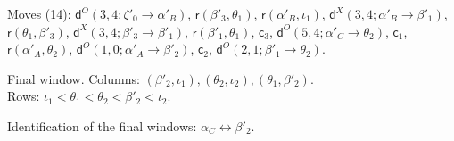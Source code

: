 \documentclass[11pt]{amsart}
\theoremstyle{definition}
\theoremstyle{remark}
\begin{document}
\noindent Moves (14): $\mathsf{d}^{O}(3,4;\zeta'_0\to\alpha'_B)$, $\mathsf{r}(\beta'_3,\theta_1)$, $\mathsf{r}(\alpha'_B,\iota_1)$, $\mathsf{d}^{X}(3,4;\alpha'_B\to\beta'_1)$, $\mathsf{r}(\theta_1,\beta'_3)$, $\mathsf{d}^{X}(3,4;\beta'_3\to\beta'_1)$, $\mathsf{r}(\beta'_1,\theta_1)$, $\mathsf{c}_{3}$, $\mathsf{d}^{O}(5,4;\alpha'_C\to\theta_2)$, $\mathsf{c}_{1}$, $\mathsf{r}(\alpha'_A,\theta_2)$, $\mathsf{d}^{O}(1,0;\alpha'_A\to\beta'_2)$, $\mathsf{c}_{2}$, $\mathsf{d}^{O}(2,1;\beta'_1\to\theta_2)$.\par
\noindent Final window. Columns: $(\beta'_2,\iota_1),\allowbreak (\theta_2,\iota_2),\allowbreak (\theta_1,\beta'_2)$.\\ Rows: $\iota_1 <\allowbreak \theta_1 <\allowbreak \theta_2 <\allowbreak \beta'_2 <\allowbreak \iota_2$.\par\medskip
\noindent Identification of the final windows: $\alpha_C\leftrightarrow \beta'_2$.\par\bigskip
\end{document}
